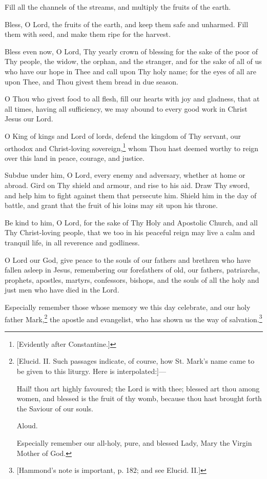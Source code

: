 Fill all the channels of the streams, and multiply the fruits of the earth.

Bless, O Lord, the fruits of the earth, and keep them safe and unharmed. Fill them with seed, and make them ripe for the harvest.

Bless even now, O Lord, Thy yearly crown of blessing for the sake of the poor of Thy people, the widow, the orphan, and the stranger, and for the sake of all of us who have our hope in Thee and call upon Thy holy name; for the eyes of all are upon Thee, and Thou givest them bread in due season.

O Thou who givest food to all flesh, fill our hearts with joy and gladness, that at all times, having all sufficiency, we may abound to every good work in Christ Jesus our Lord.

O King of kings and Lord of lords, defend the kingdom of Thy servant, our orthodox and Christ-loving sovereign,\footnote{\par{}  [Evidently after Constantine.]} whom Thou hast deemed worthy to reign over this land in peace, courage, and justice.

Subdue under him, O Lord, every enemy and adversary, whether at home or abroad. Gird on Thy shield and armour, and rise to his aid. Draw Thy sword, and help him to fight against them that persecute him. Shield him in the day of battle, and grant that the fruit of his loins may sit upon his throne.

Be kind to him, O Lord, for the sake of Thy Holy and Apostolic Church, and all Thy Christ-loving people, that we too in his peaceful reign may live a calm and tranquil life, in all reverence and godliness.

O Lord our God, give peace to the souls of our fathers and brethren who have fallen asleep in Jesus, remembering our forefathers of old, our fathers, patriarchs, prophets, apostles, martyrs, confessors, bishops, and the souls of all the holy and just men who have died in the Lord.

Especially remember those whose memory we this day celebrate, and our holy father Mark,\footnote{\par{}  [Elucid. II. Such passages indicate, of course, how St. Mark’s name came to be given to this liturgy. Here is interpolated:]—  \par Hail! thou art highly favoured; the Lord is with thee; blessed art thou among women, and blessed is the fruit of thy womb, because thou hast brought forth the Saviour of our souls.  \par Aloud.  \par Especially remember our all-holy, pure, and blessed Lady, Mary the Virgin Mother of God.} the apostle and evangelist, who has shown us the way of salvation.\footnote{\par{}  [Hammond’s note is important, p. 182; and see Elucid. II.]}

